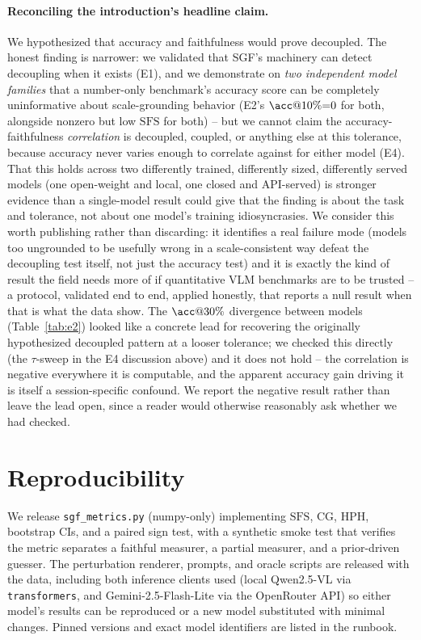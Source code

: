 \documentclass[11pt]{article}
\newcommand{\sfs}{\mathrm{SFS}}
\newcommand{\cg}{\mathrm{CG}}
\newcommand{\hph}{\mathrm{HPH}}
\begin{document}
\paragraph{Reconciling the introduction's headline claim.} We hypothesized that
accuracy and faithfulness would prove decoupled. The honest finding is
narrower: we validated that SGF's machinery can detect decoupling when it
exists (E1), and we demonstrate on \emph{two independent model families} that a
number-only benchmark's accuracy score can be completely uninformative about
scale-grounding behavior (E2's $\acc@10\%{=}0$ for both, alongside nonzero but
low $\sfs$ for both) -- but we cannot claim the accuracy-faithfulness
\emph{correlation} is decoupled, coupled, or anything else at this tolerance,
because accuracy never varies enough to correlate against for either model
(E4). That this holds across two differently trained, differently sized,
differently served models (one open-weight and local, one closed and
API-served) is stronger evidence than a single-model result could give that the
finding is about the task and tolerance, not about one model's training
idiosyncrasies. We consider this worth publishing rather than discarding: it
identifies a real failure mode (models too ungrounded to be usefully wrong in a
scale-consistent way defeat the decoupling test itself, not just the accuracy
test) and it is exactly the kind of result the field needs more of if
quantitative VLM benchmarks are to be trusted -- a protocol, validated end to
end, applied honestly, that reports a null result when that is what the data
show. The $\acc@30\%$ divergence between models (Table~\ref{tab:e2}) looked
like a concrete lead for recovering the originally hypothesized decoupled
pattern at a looser tolerance; we checked this directly (the $\tau$-sweep in
the E4 discussion above) and it does not hold -- the correlation is negative
everywhere it is computable, and the apparent accuracy gain driving it is
itself a session-specific confound. We report the negative result rather than
leave the lead open, since a reader would otherwise reasonably ask whether we
had checked.

\section{Reproducibility}
\label{sec:repro}
We release \texttt{sgf\_metrics.py} (numpy-only) implementing $\sfs$, $\cg$,
$\hph$, bootstrap CIs, and a paired sign test, with a synthetic smoke test that
verifies the metric separates a faithful measurer, a partial measurer, and a
prior-driven guesser. The perturbation renderer, prompts, and oracle scripts are
released with the data, including both inference clients used
(local Qwen2.5-VL via \texttt{transformers}, and Gemini-2.5-Flash-Lite via the
OpenRouter API) so either model's results can be reproduced or a new model
substituted with minimal changes. Pinned versions and exact model identifiers
are listed in the runbook.
\end{document}
